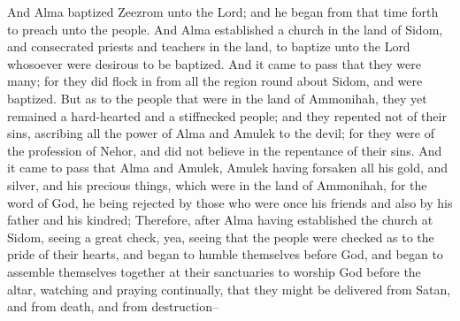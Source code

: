 \bverse \iffalse And Alma baptized Zeezrom unto the Lord; and he began from that time forth to preach unto the people. \fi
And Alma baptized Zeezrom unto the Lord; and he began from that time forth to preach unto the people.
\bverse \iffalse And Alma established a church in the land of Sidom, and consecrated priests and teachers in the land, to baptize unto the Lord whosoever were desirous to be baptized. \fi
And Alma established a church in the land of Sidom, and consecrated priests and teachers in the land, to baptize unto the Lord whosoever were desirous to be baptized.
\bverse \iffalse And it came to pass that they were many; for they did flock in from all the region round about Sidom, and were baptized. \fi
And it came to pass that they were many; for they did flock in from all the region round about Sidom, and were baptized.
\bverse \iffalse But as to the people that were in the land of Ammonihah, they yet remained a hard-hearted and a stiffnecked people; and they repented not of their sins, ascribing all the power of Alma and Amulek to the devil; for they were of the profession of Nehor, and did not believe in the repentance of their sins. \fi
But as to the people that were in the land of Ammonihah, they yet remained a hard-hearted and a stiffnecked people; and they repented not of their sins, ascribing all the power of Alma and Amulek to the devil; for they were of the profession of Nehor, and did not believe in the repentance of their sins.
\bverse \iffalse And it came to pass that Alma and Amulek, Amulek having forsaken all his gold, and silver, and his precious things, which were in the land of Ammonihah, for the word of God, he being rejected by those who were once his friends and also by his father and his kindred; \fi
And it came to pass that Alma and Amulek, Amulek having forsaken all his gold, and silver, and his precious things, which were in the land of Ammonihah, for the word of God, he being rejected by those who were once his friends and also by his father and his kindred;
\bverse \iffalse Therefore, after Alma having established the church at Sidom, seeing a great check, yea, seeing that the people were checked as to the pride of their hearts, and began to humble themselves before God, and began to assemble themselves together at their sanctuaries to worship God before the altar, watching and praying continually, that they might be delivered from Satan, and from death, and from destruction-- \fi
Therefore, after Alma having established the church at Sidom, seeing a great check, yea, seeing that the people were checked as to the pride of their hearts, and began to humble themselves before God, and began to assemble themselves together at their sanctuaries to worship God before the altar, watching and praying continually, that they might be delivered from Satan, and from death, and from destruction--
